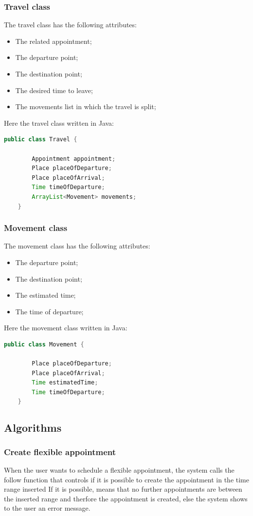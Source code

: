 \subsubsection{Travel class}

The travel class has the following attributes:
\begin{itemize}
	\item The related appointment;
	\item The departure point;
	\item The destination point;
	\item The desired time to leave;
	\item The movements list in which the travel is split;
\end{itemize}

Here the travel class written in Java:
\begin{lstlisting}[language=Java]
	public class Travel {
	
		Appointment appointment;
		Place placeOfDeparture;
		Place placeOfArrival;
		Time timeOfDeparture;
		ArrayList<Movement> movements;
	}
\end{lstlisting}

\subsubsection{Movement class}

The movement class has the following attributes:
\begin{itemize}
	\item The departure point;
	\item The destination point;
	\item The estimated time;
	\item The time of departure;
\end{itemize}

Here the movement class written in Java:
\begin{lstlisting}[language=Java]
	public class Movement {
		
		Place placeOfDeparture;
		Place placeOfArrival;
		Time estimatedTime;
		Time timeOfDeparture;
	}
\end{lstlisting}

\subsection{Algorithms}
\label{subsec:algorithm}
\subsubsection{Create flexible appointment}
\label{subsec:algFlexibleAppointment}
When the user wants to schedule a flexible appointment, the system calls the follow function that controls if it is possible to create the appointment in the time range inserted
If it is possible, means that no further appointments are between the inserted range and therfore the appointment is created, else the system shows to the user an error message.

